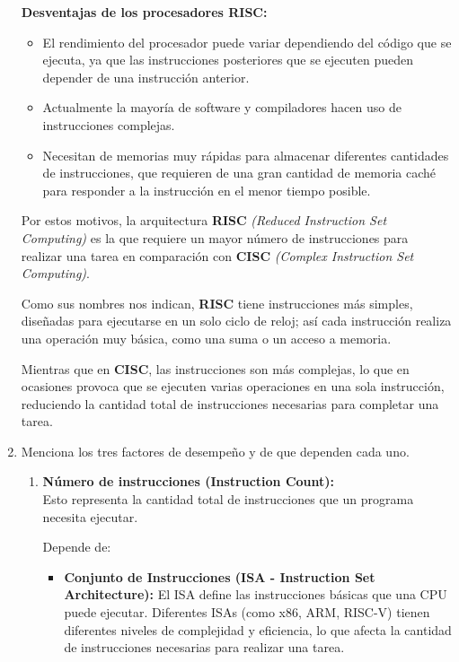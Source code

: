 \documentclass[12pt,letterpaper]{article}
\begin{document}
\begin{enumerate}
  \textbf{Desventajas de los procesadores RISC:}
  \begin{itemize}
  \item El rendimiento del procesador puede variar dependiendo del código que se ejecuta, ya que las instrucciones posteriores que se ejecuten pueden depender de una instrucción anterior.
  \item Actualmente la mayoría de software y compiladores hacen uso de instrucciones complejas.
  \item Necesitan de memorias muy rápidas para almacenar diferentes cantidades de instrucciones, que requieren de una gran cantidad de memoria caché para responder a la instrucción en el menor tiempo posible.
  \end{itemize}
  
  Por estos motivos, la arquitectura \textbf{RISC} \textit{(Reduced Instruction Set Computing)} es la que requiere un mayor número de instrucciones para realizar una tarea en comparación con \textbf{CISC} \textit{(Complex Instruction Set Computing)}.
  
  Como sus nombres nos indican, \textbf{RISC} tiene instrucciones más simples, diseñadas para ejecutarse en un solo ciclo de reloj; así cada instrucción realiza una operación muy básica, como una suma o un acceso a memoria.
  
  Mientras que en \textbf{CISC}, las instrucciones son más complejas, lo que en ocasiones provoca que se ejecuten varias operaciones en una sola instrucción, reduciendo la cantidad total de instrucciones necesarias para completar una tarea.
  \bigskip

\item Menciona los tres factores de desempeño y de que dependen cada uno.
  \bigskip

  \begin{enumerate}[label=\arabic*)]
  \item \textbf{Número de instrucciones (Instruction Count):}\\ 
    Esto representa la cantidad total de instrucciones que un programa necesita ejecutar.
    
    Depende de:\\
    \begin{itemize}
    \item \textbf{Conjunto de Instrucciones (ISA - Instruction Set Architecture):} El ISA define las instrucciones básicas que una CPU puede ejecutar. Diferentes ISAs (como x86, ARM, RISC-V) tienen diferentes niveles de complejidad y eficiencia, lo que afecta la cantidad de instrucciones necesarias para realizar una tarea.
      

\end{itemize}
\end{enumerate}
\end{enumerate}
\end{document}
